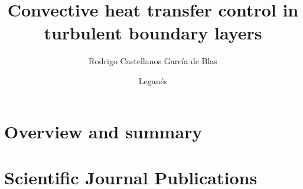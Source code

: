 \documentclass[thesissizeB5,twoside,onecolumn,10pt]{MechThesis}
\title[Convective heat transfer control in turbulent boundary layers]%
{%
	Convective heat transfer control in turbulent boundary layers
}%
\author{Rodrigo Castellanos Garc\'ia de Blas}%
\affiliation
{%
	Aerospace Engineering Department, Universidad Carlos III de Madrid\\
	Avenida de la Universidad, 30, Legan\'es, Spain
}%
\date{Legan\'es}{October}{2022}%
\begin{document}
%
%

\frontmatter




%
\mainmatter

\part{Overview and summary}

%



%
\tocpagebreak


%
\part{Scientific Journal Publications}
%
\makepapersummary
\cleardoublepage








%

%
\end{document}
